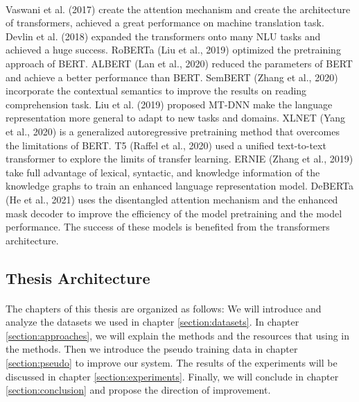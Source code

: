 \documentclass[12pt]{article}
\begin{document}
\begin{CJK*}{UTF8}{bkai}
\begin{spacing}{1.77}
\paragraph{}
Vaswani et al. (2017)\cite{vaswani2017attention} create the attention mechanism and create the architecture of transformers, achieved a great performance on machine translation task. Devlin et al. (2018)\cite{devlin2018bert} expanded the transformers onto many NLU tasks and achieved a huge success. RoBERTa (Liu et al., 2019)\cite{liu2019roberta} optimized the pretraining approach of BERT. ALBERT (Lan et al., 2020)\cite{lan2020albert} reduced the parameters of BERT and achieve a better performance than BERT. SemBERT (Zhang et al., 2020)\cite{zhang2020sembert} incorporate the contextual semantics to improve the results on reading comprehension task. Liu et al. (2019)\cite{liu2019mtdnn} proposed MT-DNN make the language representation more general to adapt to new tasks and domains. XLNET (Yang et al., 2020)\cite{yang2020xlnet} is a generalized autoregressive pretraining method that overcomes the limitations of BERT. T5 (Raffel et al., 2020)\cite{raffel2020t5} used a unified text-to-text transformer to explore the limits of transfer learning. ERNIE (Zhang et al., 2019)\cite{zhang2019ernie} take full advantage of lexical, syntactic, and knowledge information of the knowledge graphs to train an enhanced language representation model. DeBERTa (He et al., 2021)\cite{he2021deberta} uses the disentangled attention mechanism and the enhanced mask decoder to improve the efficiency of the model pretraining and the model performance. The success of these models is benefited from the transformers architecture.

\subsection{Thesis Architecture}
\paragraph{}
The chapters of this thesis are organized as follows: We will introduce and analyze the datasets we used in chapter \ref{section:datasets}. In chapter \ref{section:approaches}, we will explain the methods and the resources that using in the methods. Then we introduce the pseudo training data in chapter \ref{section:pseudo} to improve our system. The results of the experiments will be discussed in chapter \ref{section:experiments}. Finally, we will conclude in chapter \ref{section:conclusion} and propose the direction of improvement.


\end{spacing}
\end{CJK*}
\end{document}
